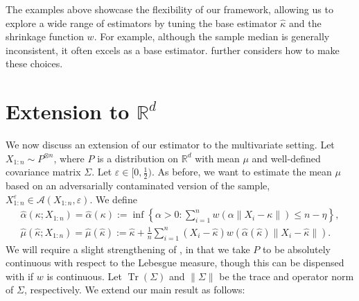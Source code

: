 \documentclass{article}
\theoremstyle{plain}
\theoremstyle{definition}
\def\R{\mathbb{R}} %
\def\eps{\varepsilon}
\DeclareMathOperator{\tr}{Tr}
\def\sA{\mathcal{A}}
\begin{document}
The examples above showcase the flexibility of our framework, allowing us to explore a wide range of estimators by tuning the base estimator \( \widehat{\kappa }  \) and the shrinkage function \( w \). For example, although the sample median is generally inconsistent, it often excels as a base estimator.  further considers how to make these choices.








\section{Extension to \( \R^d \)}\label{sec:extension_multivariate}

We now discuss an extension of our estimator to the multivariate setting. Let \( X_{1:n} \sim P^{\otimes n}\), where \( P \) is a distribution on \( \R^d \) with mean \( \mu  \) and well-defined covariance matrix \( \Sigma  \). Let \( \eps \in [0,\frac{1}{2}) \). As before, we want to estimate the mean \( \mu  \) based on an adversarially contaminated version of the sample, \( X_{1:n}^\varepsilon  \in \sA(X_{1:n},\varepsilon ) \). 
We define
\begin{align}
  \widehat{\alpha }(\kappa;X_{1:n})=\widehat{\alpha }(\kappa ):=\inf \left\{\alpha > 0: \sum_{i=1}^n w(\alpha \lVert X_i -\kappa  \rVert  ) \le n - \eta  \right\},\label{eq:def_alpha_multivariate}\\   
  \widehat{\mu }(\widehat{\kappa };X_{1:n} )=\widehat{\mu }(\widehat{\kappa } ):= \widehat{\kappa }+ \frac{1}{n}\sum_{i=1}^n (X_i -\widehat{\kappa } )w(\widehat{\alpha }(\widehat{\kappa } ) \lVert X_i -\widehat{\kappa }  \rVert  )\label{eq:def_estimator_multivariate}.
\end{align}
We will require a slight strengthening of , in that we take \( P \) to be absolutely continuous with respect to the Lebesgue measure, though this can be dispensed with if \( w \) is continuous.
Let $\tr(\Sigma)$ and $\|\Sigma\|$ be the trace and operator norm of $\Sigma$, respectively. We extend our main result as follows:
\end{document}
